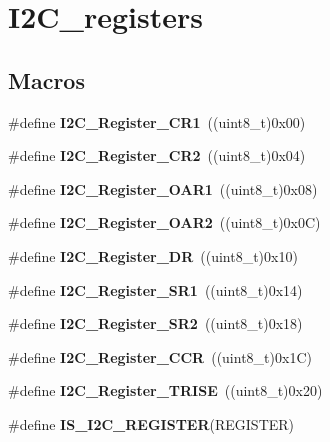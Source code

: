 \hypertarget{group___i2_c__registers}{}\section{I2\+C\+\_\+registers}
\label{group___i2_c__registers}
\subsection*{Macros}
\begin{DoxyCompactItemize}
\item 
\mbox{\label{group___i2_c__registers_ga4b9e7934e490c3540e50cf2f1d0a7688}} 
\#define {\bfseries I2\+C\+\_\+\+Register\+\_\+\+C\+R1}~((uint8\+\_\+t)0x00)
\item 
\mbox{\label{group___i2_c__registers_gaf278337dd03b6ae56eac3f335381eca3}} 
\#define {\bfseries I2\+C\+\_\+\+Register\+\_\+\+C\+R2}~((uint8\+\_\+t)0x04)
\item 
\mbox{\label{group___i2_c__registers_ga706317a00c0d450e95c00efd2afe1836}} 
\#define {\bfseries I2\+C\+\_\+\+Register\+\_\+\+O\+A\+R1}~((uint8\+\_\+t)0x08)
\item 
\mbox{\label{group___i2_c__registers_gaffdc1902493456dea95216a39fc54e2b}} 
\#define {\bfseries I2\+C\+\_\+\+Register\+\_\+\+O\+A\+R2}~((uint8\+\_\+t)0x0\+C)
\item 
\mbox{\label{group___i2_c__registers_gaea281721e7a8461d90bf59898487c096}} 
\#define {\bfseries I2\+C\+\_\+\+Register\+\_\+\+DR}~((uint8\+\_\+t)0x10)
\item 
\mbox{\label{group___i2_c__registers_gaf3bc5f4dc87513e2eceba4f503c14d6a}} 
\#define {\bfseries I2\+C\+\_\+\+Register\+\_\+\+S\+R1}~((uint8\+\_\+t)0x14)
\item 
\mbox{\label{group___i2_c__registers_ga0b5f7949e449223ec97e0169d79d007d}} 
\#define {\bfseries I2\+C\+\_\+\+Register\+\_\+\+S\+R2}~((uint8\+\_\+t)0x18)
\item 
\mbox{\label{group___i2_c__registers_ga7a0de765650408f3915b54141f052c5b}} 
\#define {\bfseries I2\+C\+\_\+\+Register\+\_\+\+C\+CR}~((uint8\+\_\+t)0x1\+C)
\item 
\mbox{\label{group___i2_c__registers_ga488c25a0a9f2c572af28768589fcbab2}} 
\#define {\bfseries I2\+C\+\_\+\+Register\+\_\+\+T\+R\+I\+SE}~((uint8\+\_\+t)0x20)
\item 
\#define {\bfseries I\+S\+\_\+\+I2\+C\+\_\+\+R\+E\+G\+I\+S\+T\+ER}(R\+E\+G\+I\+S\+T\+ER)
\end{DoxyCompactItemize}


